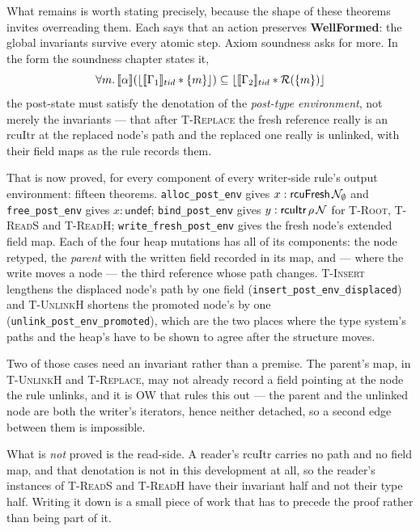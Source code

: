 What remains is worth stating precisely, because the shape of these theorems
invites overreading them.  Each says that an action preserves
\textbf{WellFormed}: the global invariants survive every atomic step.  Axiom
soundness asks for more.  In the form the soundness chapter states it,
\[\forall m \ldotp \llbracket \alpha \rrbracket (\lfloor \llbracket \Gamma_{1}
\rrbracket_{tid} * \{m\} \rfloor) \subseteq \lfloor \llbracket \Gamma_{2}
\rrbracket_{tid} * \mathcal{R}(\{m\}) \rfloor\]
the post-state must satisfy the denotation of the \emph{post-type environment},
not merely the invariants --- that after \textsc{T-Replace} the fresh reference
really is an \textsf{rcuItr} at the replaced node's path and the replaced one
really is \textsf{unlinked}, with their field maps as the rule records them.

That is now proved, for every component of every writer-side rule's output
environment: fifteen theorems.  \texttt{alloc\_post\_env} gives
$x : \textsf{rcuFresh}\,\mathcal{N}_\emptyset$ and \texttt{free\_post\_env} gives
$x : \textsf{undef}$; \texttt{bind\_post\_env} gives $y :
\textsf{rcuItr}\,\rho\,\mathcal{N}$ for \textsc{T-Root}, \textsc{T-ReadS} and
\textsc{T-ReadH}; \texttt{write\_fresh\_post\_env} gives the fresh node's
extended field map.  Each of the four heap mutations has all of its components:
the node retyped, the \emph{parent} with the written field recorded in its map,
and --- where the write moves a node --- the third reference whose path changes.
\textsc{T-Insert} lengthens the displaced node's path by one field
(\texttt{insert\_post\_env\_displaced}) and \textsc{T-UnlinkH} shortens the
promoted node's by one (\texttt{unlink\_post\_env\_promoted}), which are the two
places where the type system's paths and the heap's have to be shown to agree
after the structure moves.

Two of those cases need an invariant rather than a premise.  The parent's map,
in \textsc{T-UnlinkH} and \textsc{T-Replace}, may not already record a field
pointing at the node the rule unlinks, and it is OW that rules this out --- the
parent and the unlinked node are both the writer's iterators, hence neither
detached, so a second edge between them is impossible.

What is \emph{not} proved is the read-side.  A reader's \textsf{rcuItr} carries
no path and no field map, and that denotation is not in this development at
all, so the reader's instances of \textsc{T-ReadS} and \textsc{T-ReadH} have
their invariant half and not their type half.  Writing it down is a small piece
of work that has to precede the proof rather than being part of it.

